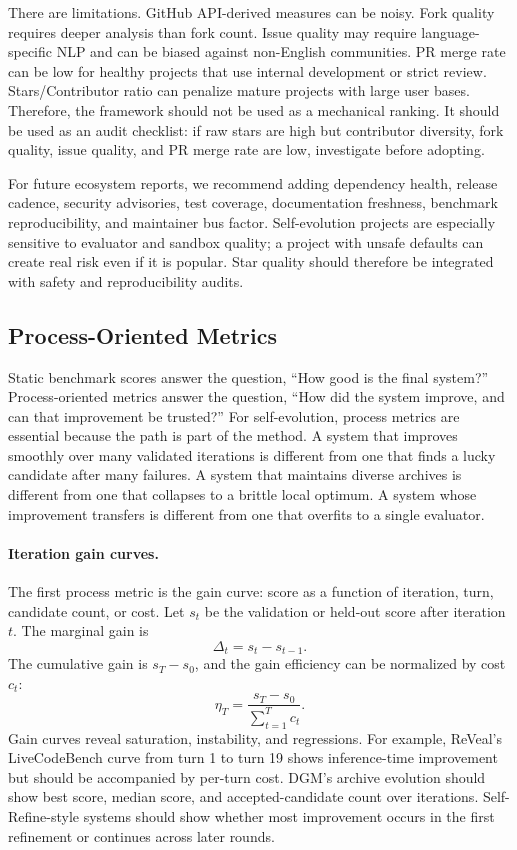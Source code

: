 There are limitations. GitHub API-derived measures can be noisy. Fork quality requires deeper analysis than fork count. Issue quality may require language-specific NLP and can be biased against non-English communities. PR merge rate can be low for healthy projects that use internal development or strict review. Stars/Contributor ratio can penalize mature projects with large user bases. Therefore, the framework should not be used as a mechanical ranking. It should be used as an audit checklist: if raw stars are high but contributor diversity, fork quality, issue quality, and PR merge rate are low, investigate before adopting.

For future ecosystem reports, we recommend adding dependency health, release cadence, security advisories, test coverage, documentation freshness, benchmark reproducibility, and maintainer bus factor. Self-evolution projects are especially sensitive to evaluator and sandbox quality; a project with unsafe defaults can create real risk even if it is popular. Star quality should therefore be integrated with safety and reproducibility audits.

\subsection{Process-Oriented Metrics}
\label{subsec:process-oriented-metrics}

Static benchmark scores answer the question, ``How good is the final system?'' Process-oriented metrics answer the question, ``How did the system improve, and can that improvement be trusted?'' For self-evolution, process metrics are essential because the path is part of the method. A system that improves smoothly over many validated iterations is different from one that finds a lucky candidate after many failures. A system that maintains diverse archives is different from one that collapses to a brittle local optimum. A system whose improvement transfers is different from one that overfits to a single evaluator.

\paragraph{Iteration gain curves.}
The first process metric is the gain curve: score as a function of iteration, turn, candidate count, or cost. Let $s_t$ be the validation or held-out score after iteration $t$. The marginal gain is
\begin{equation}
\Delta_t = s_t - s_{t-1}.
\end{equation}
The cumulative gain is $s_T-s_0$, and the gain efficiency can be normalized by cost $c_t$:
\begin{equation}
\eta_T = \frac{s_T-s_0}{\sum_{t=1}^{T} c_t}.
\end{equation}
Gain curves reveal saturation, instability, and regressions. For example, ReVeal's LiveCodeBench curve from turn 1 to turn 19 shows inference-time improvement but should be accompanied by per-turn cost. DGM's archive evolution should show best score, median score, and accepted-candidate count over iterations. Self-Refine-style systems should show whether most improvement occurs in the first refinement or continues across later rounds.

